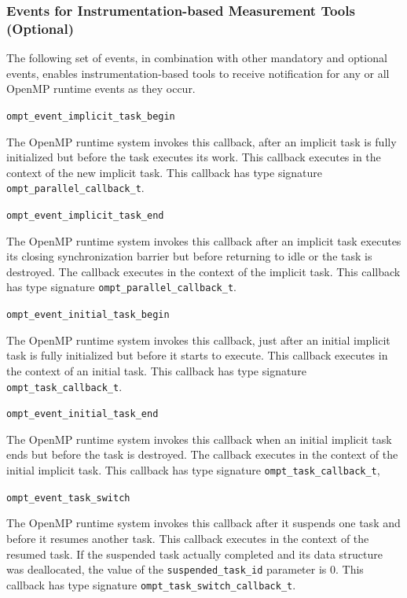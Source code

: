 \documentclass{article}
\newcommand{\descheader}[1]{{\needspace{3\baselineskip}\vspace{1em}\noindent \fbox{#1}}}
\begin{document}
\subsubsection{Events for Instrumentation-based Measurement Tools (Optional)}
The following set of events, in combination with other mandatory and optional events, 
enables instrumentation-based tools to receive notification for any or all OpenMP runtime events as they occur.

\descheader{Task Creation and Destruction}

\begin{description}
\sloppy

\item \verb|ompt_event_implicit_task_begin|

   The OpenMP runtime system invokes this callback,
after an
   implicit task is fully initialized but before the task executes
   its work. This callback executes in the context of the new implicit
   task.
   This callback has type signature \verb|ompt_parallel_callback_t|. 

\item \verb|ompt_event_implicit_task_end|
 
   The OpenMP runtime system invokes this callback after an implicit
   task executes its closing synchronization barrier but before
   returning to idle or the task is destroyed.  The callback
   executes in the context of the implicit task.
   This callback has type signature \verb|ompt_parallel_callback_t|.
   

\item \verb|ompt_event_initial_task_begin|

   The OpenMP runtime system invokes this callback,
just after an initial
   implicit task is fully initialized but before it starts to execute. This callback executes in the context of an initial 
   task.
   This callback has type signature \verb|ompt_task_callback_t|. 

\item \verb|ompt_event_initial_task_end|
 
   The OpenMP runtime system invokes this callback when an initial implicit
   task ends but before the task is destroyed.  The callback
   executes in the context of the initial implicit task.
   This callback has type signature \verb|ompt_task_callback_t|,

\item \verb|ompt_event_task_switch|

 The OpenMP runtime system invokes this callback after it
 suspends one task and before it resumes another task.  This
 callback executes in the context of the resumed task.  If the
 suspended task actually completed and its data structure was
 deallocated, the value of the  \verb|suspended_task_id| parameter is 0.
 This callback has type signature \verb|ompt_task_switch_callback_t|.

\end{description}
\end{document}

